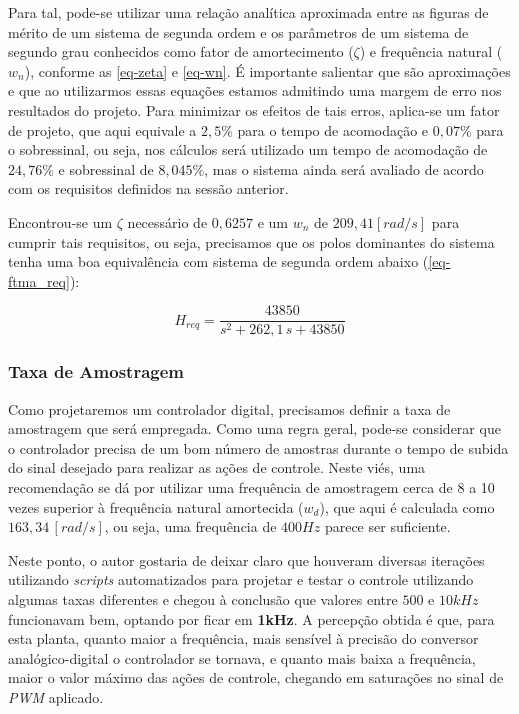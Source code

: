 \documentclass[
	12pt,				%
	article,			%
	openright,			%
	oneside,
	a4paper,			%
	chapter=TITLE,		%
	section=TITLE,		%
	english,			%
	french,				%
	spanish,			%
	brazil,				%
]{abntex2}
\begin{document}
            Para tal, pode-se utilizar uma relação analítica aproximada entre as figuras de mérito de um sistema de segunda ordem e os parâmetros de um sistema de segundo grau conhecidos como fator de amortecimento ($\zeta$) e frequência natural ($w_n$), conforme as \autoref{eq-zeta} e \autoref{eq-wn}. É importante salientar que são aproximações e que ao utilizarmos essas equações estamos admitindo uma margem de erro nos resultados do projeto. Para minimizar os efeitos de tais erros, aplica-se um fator de projeto, que aqui equivale a $2,5\%$ para o tempo de acomodação e $0,07\%$ para o sobressinal, ou seja, nos cálculos será utilizado um tempo de acomodação de $24,76\%$ e sobressinal de $8,045\%$, mas o sistema ainda será avaliado de acordo com os requisitos definidos na sessão anterior.
            
            Encontrou-se um $\zeta$ necessário de $0,6257$ e um $w_n$ de $209,41 [rad/s]$ para cumprir tais requisitos, ou seja, precisamos que os polos dominantes do sistema tenha uma boa equivalência com sistema de segunda ordem abaixo (\ref{eq-ftma_req}):
            
            \begin{equation}
                \label{eq-ftma_req}
                H_{req} = \frac{43850}{s^2 +262,1\,s + 43850}
            \end{equation}
        
            \subsubsection{Taxa de Amostragem}
            
                Como projetaremos um controlador digital, precisamos definir a taxa de amostragem que será empregada. Como uma regra geral, pode-se considerar que o controlador precisa de um bom número de amostras durante o tempo de subida do sinal desejado para realizar as ações de controle. Neste viés, uma recomendação se dá por utilizar uma frequência de amostragem cerca de 8 a 10 vezes superior à frequência natural amortecida ($w_d$), que aqui é calculada como $163,34\,[rad/s]$, ou seja, uma frequência de $400Hz$ parece ser suficiente. 
                
                Neste ponto, o autor gostaria de deixar claro que houveram diversas iterações utilizando \textit{scripts} automatizados para projetar e testar o controle utilizando algumas taxas diferentes e chegou à conclusão que valores entre $500$ e $10kHz$ funcionavam bem, optando por ficar em \textbf{1kHz}. A percepção obtida é que, para esta planta, quanto maior a frequência, mais sensível à precisão do conversor analógico-digital o controlador se tornava, e quanto mais baixa a frequência, maior o valor máximo das ações de controle, chegando em saturações no sinal de \textit{PWM} aplicado.
                
\end{document}

